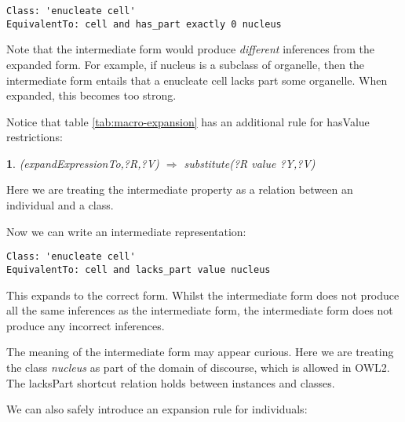 \documentclass{llncs}
\newtheorem{exprule}{}[section]
\begin{document}
\begin{verbatim}
Class: 'enucleate cell'
EquivalentTo: cell and has_part exactly 0 nucleus
\end{verbatim}


Note that the intermediate form would produce \emph{different}
inferences from the expanded form. For example, if nucleus is a
subclass of organelle, then the intermediate form entails that a
enucleate cell lacks part some organelle. When expanded, this becomes
too strong.

Notice that table \ref{tab:macro-expansion} has an additional rule for
hasValue restrictions:

\begin{exprule}\label{exp-some}
(expandExpressionTo,?R,?V)  $\Rightarrow$ \newline
substitute(?R value ?Y,?V)
\end{exprule}

Here we are treating the intermediate property as a relation between
an individual and a class.

Now we can write an intermediate representation:

\begin{verbatim}
Class: 'enucleate cell'
EquivalentTo: cell and lacks_part value nucleus
\end{verbatim}


This expands to the correct form. Whilst the intermediate form does
not produce all the same inferences as the intermediate form, the
intermediate form does not produce any incorrect inferences.


The meaning of the intermediate form may appear curious.  Here we are
treating the class \emph{nucleus} as part of the domain of discourse,
which is allowed in OWL2. The lacksPart shortcut relation holds between
instances  and classes.

We can also safely introduce an expansion rule for individuals:
\end{document}
